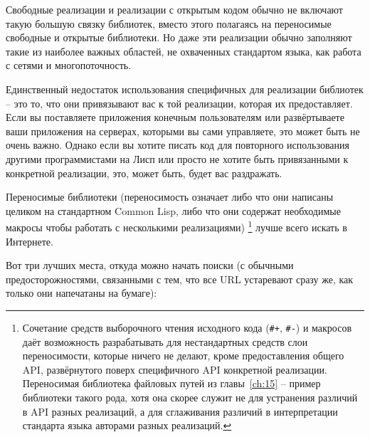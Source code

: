 Свободные реализации и реализации с открытым кодом обычно не включают такую большую связку
библиотек, вместо этого полагаясь на переносимые свободные и открытые библиотеки. Но даже
эти реализации обычно заполняют такие из наиболее важных областей, не охваченных
стандартом языка, как работа с сетями и многопоточность.

Единственный недостаток использования специфичных для реализации библиотек -- это то, что
они привязывают вас к той реализации, которая их предоставляет. Если вы поставляете
приложения конечным пользователям или развёртываете ваши приложения на серверах, которыми
вы сами управляете, это может быть не очень важно. Однако если вы хотите писать код для
повторного использования другими программистами на Лисп или просто не хотите быть
привязанными к конкретной реализации, это, может быть, будет вас раздражать.

Переносимые библиотеки (переносимость означает либо что они написаны целиком на
стандартном Common Lisp, либо что они содержат необходимые макросы чтобы работать с
несколькими реализациями) \footnote{Сочетание средств выборочного чтения исходного кода
  (\lstinline!#+!, \lstinline!#-!) и макросов даёт возможность разрабатывать для
  нестандартных средств слои переносимости, которые ничего не делают, кроме предоставления
  общего API, развёрнутого поверх специфичного API конкретной реализации. Переносимая
  библиотека файловых путей из главы~\ref{ch:15} -- пример библиотеки такого рода, хотя
  она скорее служит не для устранения различий в API разных реализаций, а для сглаживания
  различий в интерпретации стандарта языка авторами разных реализаций.} лучше всего искать
в Интернете.

Вот три лучших места, откуда можно начать поиски (с обычными предосторожностями,
связанными с тем, что все URL устаревают сразу же, как только они напечатаны на бумаге):


